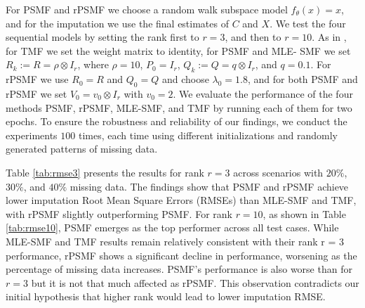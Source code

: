 \documentclass{mldsmsc}
\begin{document}
\noindent For PSMF and rPSMF we choose a random walk subspace model $f_{\theta}(x) = x$, and for the imputation we use the final estimates of $C$ and $X$. We test the four sequential models by setting the rank first to $r = 3$, and then to $r = 10$. As in \cite{akyildiz2021probabilistic}, for TMF we set the weight matrix to identity, for PSMF and MLE- SMF we set $R_k := R = \rho \otimes I_r$, where $\rho = 10$, $P_0 = I_r$, $Q_k := Q = q \otimes I_r$, and $q = 0.1$. For rPSMF we use $R_0 = R$ and $Q_0 = Q$ and choose $\lambda_0 = 1.8$, and for both PSMF and rPSMF we set $V_0 = v_0 \otimes I_r$ with $v_0 = 2$. We evaluate the performance of the four methods PSMF, rPSMF, MLE-SMF, and TMF by running each of them for two epochs. To ensure the robustness and reliability of our findings, we conduct the experiments $100$ times, each time using different initializations and randomly generated patterns of missing data. \newline

\noindent Table \ref{tab:rmse3} presents the results for rank $r = 3$ across scenarios with $20\%$, $30\%$, and $40\%$ missing data. The findings show that PSMF and rPSMF achieve lower imputation Root Mean Square Errors (RMSEs) than MLE-SMF and TMF, with rPSMF slightly outperforming PSMF. For rank $r = 10$, as shown in Table \ref{tab:rmse10}, PSMF emerges as the top performer across all test cases. While MLE-SMF and TMF results remain relatively consistent with their rank r = 3 performance, rPSMF shows a significant decline in performance, worsening as the percentage of missing data increases. PSMF's performance is also worse than for $r = 3$ but it is not that much affected as rPSMF. This observation contradicts our initial hypothesis that higher rank would lead to lower imputation RMSE. \newline
\end{document}
